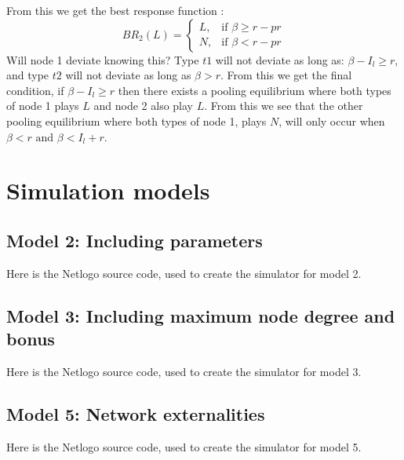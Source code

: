 From this we get the best response function :
\begin{equation}
BR_{2}(L)=
\begin{cases}
	L,& \text{if } \beta\geq r-pr\\
   N,& \text{if } \beta<r-pr  
\end{cases}
\end{equation}
Will node 1 deviate knowing this?
Type $t1$ will not deviate as long as: $\beta - I_{l} \geq r$, and type $t2$ will not deviate as long as $\beta >r$.
From this we get the final condition, if $\beta-I_{l}\geq r$ then there exists a pooling equilibrium where both types of node 1 plays $L$ and node 2 also play $L$.
From this we see that the other pooling equilibrium where both types of node 1, plays $N$, will only occur when $\beta<r \text{ and } \beta<I_l+r$.

\chapter{Simulation models}
\section{Model 2: Including parameters}
Here is the Netlogo source code, used to create the simulator for model 2.
 \begin{figure}[htp]\centering{
 }
 \end{figure}
 \newpage
 

\section{Model 3: Including maximum node degree and bonus}
Here is the Netlogo source code, used to create the simulator for model 3.
\begin{figure}[htp]\centering{
 }
 \end{figure}
 \newpage
 
\section{Model 5: Network externalities}
Here is the Netlogo source code, used to create the simulator for model 5.
\begin{figure}[htp]\centering{
 }
 \end{figure}
 \newpage
 

